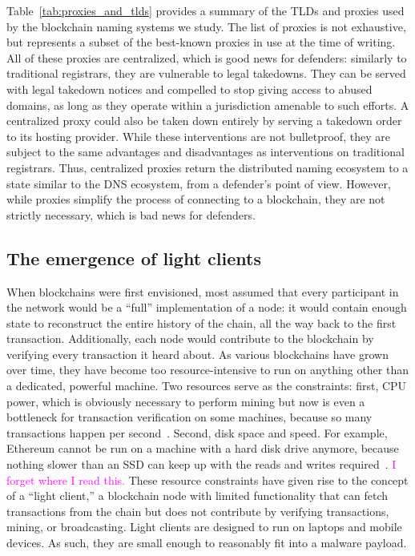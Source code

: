 \documentclass[10pt,sigconf,letterpaper]{acmart}
\newcommand{\randall}{\ding{110}\ding{43}\textcolor{magenta}}
\newcommand{\randall}{}
\begin{document}
Table~\ref{tab:proxies_and_tlds} provides a summary of the TLDs and proxies 
used by the blockchain naming systems we study. The list of proxies is not exhaustive, but 
represents 
a subset of the best-known proxies in use at the time of writing.
All of these proxies are 
centralized, which is good news for defenders: similarly to traditional 
registrars, they are vulnerable to legal takedowns. They can be served with 
legal takedown notices and compelled to stop giving access to abused domains, as long as they 
operate within a jurisdiction amenable to such efforts. A centralized proxy could also be taken 
down entirely by serving a takedown order to its hosting provider. While these interventions are 
not bulletproof, they are subject to the same advantages and disadvantages as 
interventions on traditional registrars. Thus, centralized proxies return the 
distributed naming ecosystem to a state similar to the DNS ecosystem, from a 
defender's point of view. However, while proxies simplify the process of 
connecting to a blockchain, they are not strictly necessary, which is bad news 
for defenders.


\subsection{The emergence of light clients}

When blockchains were first envisioned, most assumed that every participant in 
the network would be a ``full'' implementation of a node: it would contain 
enough state to reconstruct the entire history of the chain, all the way back 
to the first transaction. Additionally, each node would contribute to the 
blockchain by verifying every transaction it heard about. As various 
blockchains have grown over time, they have become too resource-intensive to 
run on anything other than a dedicated, powerful machine. Two 
resources serve as 
the constraints: first, CPU power, which is obviously necessary to perform 
mining but now is even a bottleneck for transaction verification on some 
machines, because so many transactions happen per 
second~\cite{citation_needed}. Second, disk 
space and speed. For example, Ethereum cannot be run on a machine with a hard 
disk drive anymore, because nothing slower than an SSD can keep up with the 
reads and writes required~\cite{citation_needed}. \randall{I 
forget where I read this.} These resource constraints have 
given rise to the concept of a ``light client,'' a blockchain 
node with limited functionality that can fetch transactions 
from the chain but does not contribute by verifying 
transactions, mining, or broadcasting. Light clients are 
designed to run on laptops and mobile devices. As 
such, they are small enough to reasonably fit into a malware 
payload. 
\end{document}
